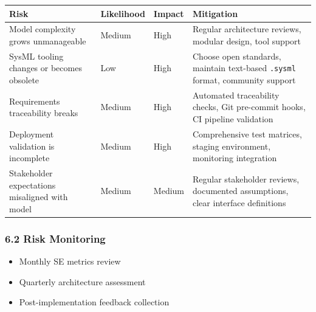 \documentclass[12pt]{article}
\providecommand{\tightlist}{%
  \setlength{\itemsep}{0pt}\setlength{\parskip}{0pt}}
\begin{document}
{\def\LTcaptype{none} %
\begin{longtable}[]{@{}
  >{\raggedright\arraybackslash}p{}
  >{\raggedleft\arraybackslash}p{}
  >{\raggedleft\arraybackslash}p{}
  >{\raggedright\arraybackslash}p{}@{}}
\toprule\noalign{}
\begin{minipage}[b]{\linewidth}\raggedright
Risk
\end{minipage} & \begin{minipage}[b]{\linewidth}\raggedleft
Likelihood
\end{minipage} & \begin{minipage}[b]{\linewidth}\raggedleft
Impact
\end{minipage} & \begin{minipage}[b]{\linewidth}\raggedright
Mitigation
\end{minipage} \\
\midrule\noalign{}
\endhead
\bottomrule\noalign{}
\endlastfoot
Model complexity grows unmanageable & Medium & High & Regular
architecture reviews, modular design, tool support \\
SysML tooling changes or becomes obsolete & Low & High & Choose open
standards, maintain text-based \texttt{.sysml} format, community
support \\
Requirements traceability breaks & Medium & High & Automated
traceability checks, Git pre-commit hooks, CI pipeline validation \\
Deployment validation is incomplete & Medium & High & Comprehensive test
matrices, staging environment, monitoring integration \\
Stakeholder expectations misaligned with model & Medium & Medium &
Regular stakeholder reviews, documented assumptions, clear interface
definitions \\
\end{longtable}
}

\subsubsection{6.2 Risk Monitoring}\label{risk-monitoring}

\begin{itemize}
\tightlist
\item
  Monthly SE metrics review
\item
  Quarterly architecture assessment
\item
  Post-implementation feedback collection
\end{itemize}
\end{document}
